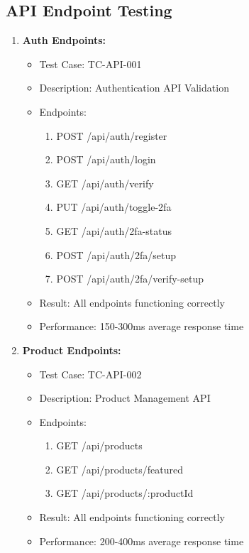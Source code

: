 \subsection{API Endpoint Testing}
\begin{enumerate}
    \item \textbf{Auth Endpoints:}
    \begin{itemize}
        \item Test Case: TC-API-001
        \item Description: Authentication API Validation
        \item Endpoints:
        \begin{enumerate}
            \item POST /api/auth/register
            \item POST /api/auth/login
            \item GET /api/auth/verify
            \item PUT /api/auth/toggle-2fa
            \item GET /api/auth/2fa-status
            \item POST /api/auth/2fa/setup
            \item POST /api/auth/2fa/verify-setup
        \end{enumerate}
        \item Result: All endpoints functioning correctly
        \item Performance: 150-300ms average response time
    \end{itemize}

    \item \textbf{Product Endpoints:}
    \begin{itemize}
        \item Test Case: TC-API-002
        \item Description: Product Management API
        \item Endpoints:
        \begin{enumerate}
            \item GET /api/products
            \item GET /api/products/featured
            \item GET /api/products/:productId
        \end{enumerate}
        \item Result: All endpoints functioning correctly
        \item Performance: 200-400ms average response time
    \end{itemize}


\end{enumerate}
